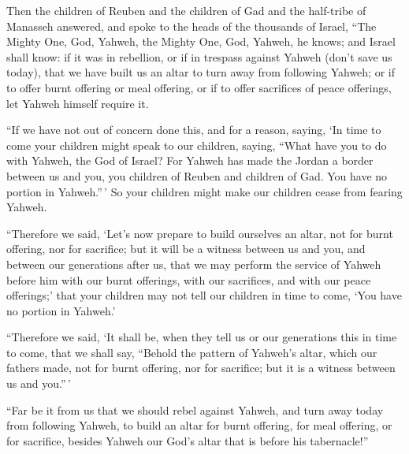  Then the children of Reuben and the children of Gad and
the half-tribe of Manasseh answered, and spoke to the heads of the
thousands of Israel,  ``The Mighty One, God, Yahweh, the
Mighty One, God, Yahweh, he knows; and Israel shall know: if it was in
rebellion, or if in trespass against Yahweh (don't save us today),
 that we have built us an altar to turn away from
following Yahweh; or if to offer burnt offering or meal offering, or if
to offer sacrifices of peace offerings, let Yahweh himself require it.

 ``If we have not out of concern done this, and for a
reason, saying, `In time to come your children might speak to our
children, saying, ``What have you to do with Yahweh, the God of Israel?
 For Yahweh has made the Jordan a border between us and
you, you children of Reuben and children of Gad. You have no portion in
Yahweh.''\,' So your children might make our children cease from fearing
Yahweh.

 ``Therefore we said, `Let's now prepare to build
ourselves an altar, not for burnt offering, nor for sacrifice;
 but it will be a witness between us and you, and between
our generations after us, that we may perform the service of Yahweh
before him with our burnt offerings, with our sacrifices, and with our
peace offerings;' that your children may not tell our children in time
to come, `You have no portion in Yahweh.'

 ``Therefore we said, `It shall be, when they tell us or
our generations this in time to come, that we shall say, ``Behold the
pattern of Yahweh's altar, which our fathers made, not for burnt
offering, nor for sacrifice; but it is a witness between us and
you.''\,'

 ``Far be it from us that we should rebel against Yahweh,
and turn away today from following Yahweh, to build an altar for burnt
offering, for meal offering, or for sacrifice, besides Yahweh our God's
altar that is before his tabernacle!''

